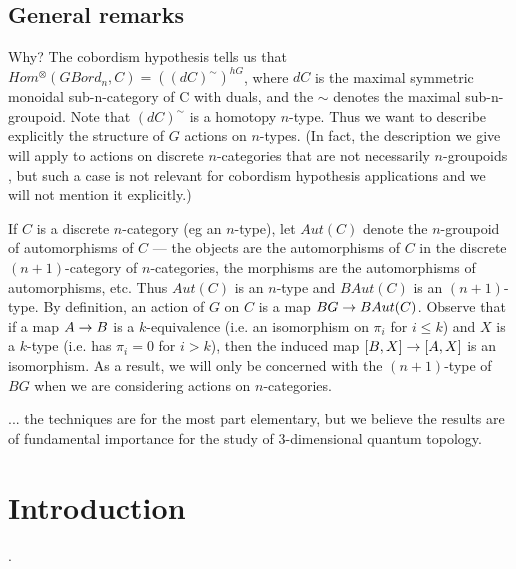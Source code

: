\documentclass{amsart}
\begin{document}

\subsection{General remarks}

Why? The cobordism hypothesis tells us that $Hom^{\otimes}(GBord_n,C) = ((dC)^{\sim})^{hG}$, where $dC$ is the maximal symmetric monoidal sub-n-category of C with duals, and the $\sim$ denotes the maximal sub-n-groupoid.  Note that $(dC)^\sim$ is a homotopy $n$-type.  Thus we want to describe explicitly the structure of $G$ actions on $n$-types.  (In fact, the description we give will apply to actions on discrete $n$-categories that are not necessarily $n$-groupoids , but such a case is not relevant for cobordism hypothesis applications and we will not mention it explicitly.)

If $C$ is a discrete $n$-category (eg an $n$-type), let $Aut(C)$ denote the $n$-groupoid of automorphisms of $C$ --- the objects are the automorphisms of $C$ in the discrete $(n+1)$-category of $n$-categories, the morphisms are the automorphisms of automorphisms, etc.  Thus $Aut(C)$ is an $n$-type and $BAut(C)$ is an $(n+1)$-type.  By definition, an action of $G$ on $C$ is a map $BG \rightarrow BAut(C)$.  Observe that if a map $A \rightarrow B$ is a $k$-equivalence (i.e. an isomorphism on $\pi_i$ for $i \leq k$) and $X$ is a $k$-type (i.e. has $\pi_i = 0$ for $i > k$), then the induced map $[B,X] \rightarrow [A,X]$ is an isomorphism.  As a result, we will only be concerned with the $(n+1)$-type of $BG$ when we are considering actions on $n$-categories.

... the techniques are for the most part elementary, but we believe the results are of fundamental importance for the study of 3-dimensional quantum topology.


\section{Introduction}
.

\end{document}
